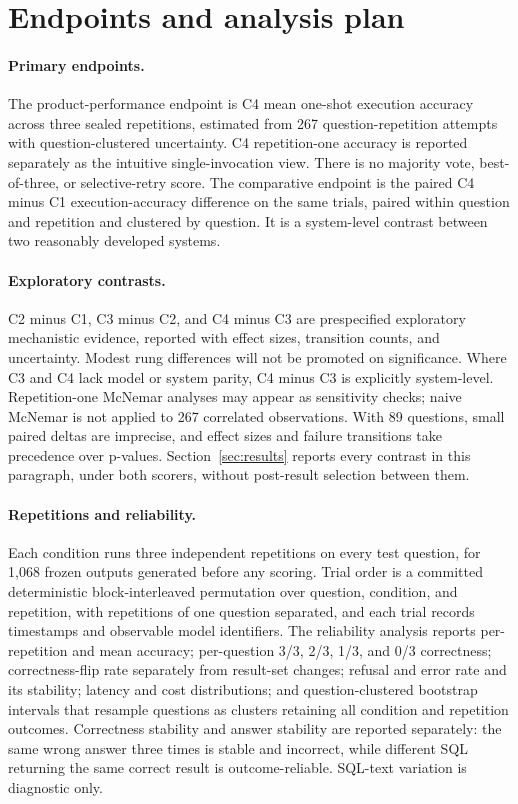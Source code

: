 \section{Endpoints and analysis plan}
\label{sec:analysis}

\paragraph{Primary endpoints.}
The product-performance endpoint is C4 mean one-shot execution accuracy across
three sealed repetitions, estimated from 267 question-repetition attempts with
question-clustered uncertainty. C4 repetition-one accuracy is reported separately
as the intuitive single-invocation view. There is no majority vote, best-of-three,
or selective-retry score. The comparative endpoint is the paired C4 minus C1
execution-accuracy difference on the same trials, paired within question and
repetition and clustered by question. It is a system-level contrast between two
reasonably developed systems.

\paragraph{Exploratory contrasts.}
C2 minus C1, C3 minus C2, and C4 minus C3 are prespecified exploratory
mechanistic evidence, reported with effect sizes, transition counts, and
uncertainty. Modest rung differences will not be promoted on significance. Where
C3 and C4 lack model or system parity, C4 minus C3 is explicitly system-level.
Repetition-one McNemar analyses may appear as sensitivity checks; naive McNemar
is not applied to 267 correlated observations. With 89 questions, small paired
deltas are imprecise, and effect sizes and failure transitions take precedence
over p-values. Section~\ref{sec:results} reports every contrast in this
paragraph, under both scorers, without post-result selection between them.

\paragraph{Repetitions and reliability.}
Each condition runs three independent repetitions on every test question, for
1,068 frozen outputs generated before any scoring. Trial order is a committed
deterministic block-interleaved permutation over question, condition, and
repetition, with repetitions of one question separated, and each trial records
timestamps and observable model identifiers. The reliability analysis reports
per-repetition and mean accuracy; per-question 3/3, 2/3, 1/3, and 0/3
correctness; correctness-flip rate separately from result-set changes; refusal and
error rate and its stability; latency and cost distributions; and
question-clustered bootstrap intervals that resample questions as clusters
retaining all condition and repetition outcomes. Correctness stability and answer
stability are reported separately: the same wrong answer three times is stable and
incorrect, while different SQL returning the same correct result is
outcome-reliable. SQL-text variation is diagnostic only.


